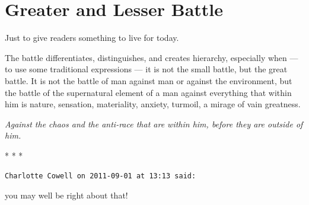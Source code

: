 \section{Greater and Lesser Battle}

Just to give readers something to live for today.

\begin{quotex}
The battle differentiates, distinguishes, and creates hierarchy, especially when --- to use some traditional expressions --- it is not the small battle, but the great battle. It is not the battle of man against man or against the environment, but the battle of the supernatural element of a man against everything that within him is nature, sensation, materiality, anxiety, turmoil, a mirage of vain greatness.

\emph{Against the chaos and the anti-race that are within him, before they are outside of him.}
\end{quotex}




\begin{center}* * *\end{center}

\begin{footnotesize}
\begin{sffamily}
\texttt{Charlotte Cowell on 2011-09-01 at 13:13 said:}

you may well be right about that!


\hfill

\end{sffamily}
\end{footnotesize}

